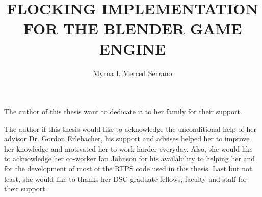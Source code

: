 \documentclass[11pt]{fsuthesis}
\title{FLOCKING IMPLEMENTATION FOR THE BLENDER GAME ENGINE}
\author{Myrna I. Merced Serrano}
\begin{document}
\frontmatter
\maketitle
\makesignaturepage

\begin{dedication}
The author of this thesis want to dedicate it to her family for their support.
\end{dedication}

\begin{acknowledgments}
The author if this thesis would like to acknowledge the unconditional help of her advisor Dr. Gordon Erlebacher, his support and advises helped her to improve her knowledge and motivated her to work harder everyday. Also, she would like to acknowledge her co-worker Ian Johnson for his availability to helping her and for the development of most of the RTPS code used in this thesis. Last but not least, she would like to thanks her DSC graduate fellows, faculty and staff for their support.
\end{acknowledgments}

\tableofcontents





\onehalfspacing

\begin{abstract}
\end{abstract}

\mainmatter

%

%

\end{document}
